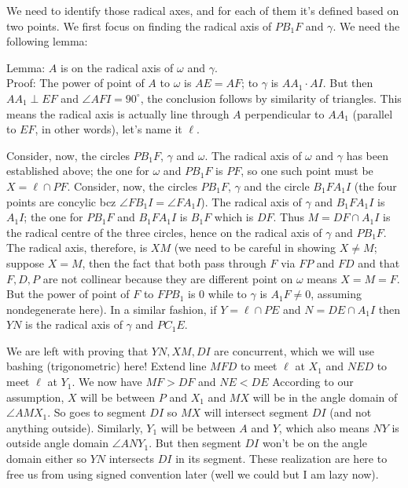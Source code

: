 \documentclass[11pt,a4paper]{article}
\newcommand{\<}{\langle}
\renewcommand{\>}{\rangle}
\begin{document}
\begin{enumerate}
	We need to identify those radical axes, and for each of them it's defined based on two points. We first focus on finding the radical axis of $PB_1F$ and $\gamma$. We need the following lemma:
	
	Lemma: $A$ is on the radical axis of $\omega$ and $\gamma$.\\
	Proof: The power of point of $A$ to $\omega$ is $AE=AF$; to $\gamma$ is $AA_1\cdot AI$. But then $AA_1\perp EF$ and $\angle AFI=90^{\circ}$, the conclusion follows by similarity of triangles. This means the radical axis is actually line through $A$ perpendicular to $AA_1$ (parallel to $EF$, in other words), let's name it $\ell$.
	
	Consider, now, the circles $PB_1F$, $\gamma$ and $\omega$. The radical axis of $\omega$ and $\gamma$ has been established above; the one for $\omega$ and $PB_1F$ is $PF$, so one such point must be $X=\ell\cap PF$. Consider, now, the circles $PB_1F$, $\gamma$ and the circle $B_1FA_1I$ (the four points are concylic bcz $\angle FB_1I=\angle FA_1I$). The radical axis of $\gamma$ and $B_1FA_1I$ is $A_1I$; the one for $PB_1F$ and $B_1FA_1I$ is $B_1F$ which is $DF$. Thus $M=DF\cap A_1I$ is the radical centre of the three circles, hence on the radical axis of $\gamma$ and $PB_1F$. The radical axis, therefore, is $XM$ (we need to be careful in showing $X\neq M$; suppose $X=M$, then the fact that both pass through $F$ via $FP$ and $FD$ and that $F, D, P$ are not collinear because they are different point on $\omega$ means $X=M=F$. But the power of point of $F$ to $FPB_1$ is 0 while to $\gamma$ is $A_1F\neq 0$, assuming nondegenerate here).
	In a similar fashion, if $Y=\ell\cap PE$ and $N=DE\cap A_1I$ then $YN$ is the radical axis of $\gamma$ and $PC_1E$.
	
	We are left with proving that $YN, XM, DI$ are concurrent, which we will use bashing (trigonometric) here! Extend line $MFD$ to meet $\ell$ at $X_1$ and $NED$ to meet $\ell$ at $Y_1$. We now have $MF>DF$ and $NE<DE$ According to our assumption, $X$ will be between $P$ and $X_1$ and $MX$ will be in the angle domain of $\angle AMX_1$. So goes to segment $DI$ so $MX$ will intersect segment $DI$ (and not anything outside). Similarly, $Y_1$ will be between $A$ and $Y$, which also means $NY$ is outside angle domain $\angle ANY_1$. But then segment $DI$ won't be on the angle domain either so $YN$ intersects $DI$ in its segment. These realization are here to free us from using signed convention later (well we could but I am lazy now).
	

\end{enumerate}
\end{document}
